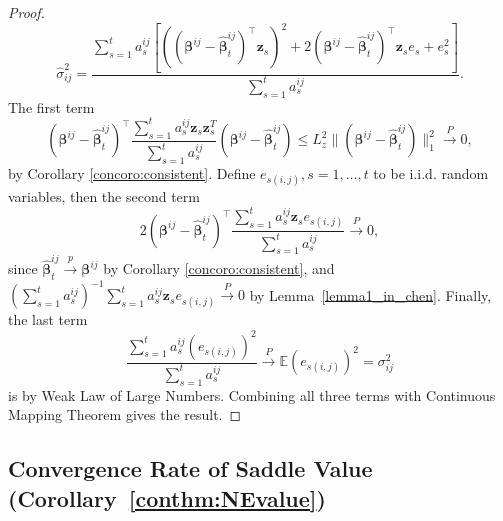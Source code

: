 \documentclass[12pt]{article}
\begin{document}
\begin{proof}
\[
\widehat{\sigma}_{ij}^2 = \frac{\sum_{s=1}^{t} a_s^{ij} \left[\left((\bm{\beta}^{ij} - \widehat{\bm{\beta}}_t^{ij})^\top \bm{z}_s\right)^2+2(\bm{\beta}^{ij} - \widehat{\bm{\beta}}_t^{ij})^\top \bm{z}_se_s+e_s^2\right]}{\sum_{s=1}^{t} a_s^{ij}}.
\]
The first term 
\[
(\bm{\beta}^{ij} - \widehat{\bm{\beta}}_t^{ij})^\top \frac{\sum_{s=1}^t a_s^{ij} \bm{z}_s \bm{z}_s^T}{\sum_{s=1}^t a_s^{ij}} (\bm{\beta}^{ij} - \widehat{\bm{\beta}}_t^{ij}) \leq L_z^2 \| (\bm{\beta}^{ij} - \widehat{\bm{\beta}}_t^{ij})\|_1^2 \overset{P}{\to} 0,
\]
by Corollary \ref{concoro:consistent}. Define $e_{s(i,j)}, s = 1, \dots, t$ to be i.i.d. random variables, then the second term 
\[
2(\bm{\beta}^{ij} - \widehat{\bm{\beta}}_t^{ij})^\top \frac{\sum_{s=1}^t a_s^{ij} \bm{z}_s e_{s(i,j)}}{\sum_{s=1}^t a_s^{ij}} \overset{P}{\to} 0,
\]
since $\widehat{\bm{\beta}}_t^{ij} \stackrel{p}{\to}\bm{\beta}^{ij}$ by Corollary \ref{concoro:consistent}, and $(\sum_{s=1}^t a_s^{ij})^{-1} \sum_{s=1}^t a_s^{ij} \bm{z}_s e_{s(i,j)} \overset{P}{\to} 0$ by Lemma~\ref{lemma1_in_chen}. Finally, the last term
\[
\frac{\sum_{s=1}^t a_s^{ij}(e_{s(i,j)})^2}{\sum_{s=1}^t a_s^{ij}} \overset{P}{\to} \mathbb{E}(e_{s(i,j)})^2 = \sigma_{ij}^2
\]
is by Weak Law of Large Numbers. Combining all three terms with Continuous Mapping Theorem gives the result.
\end{proof}


\subsection{Convergence Rate of Saddle Value (Corollary~\ref{conthm:NEvalue})}
\label{app:conthm:NEvalue_proof}
\end{document}
